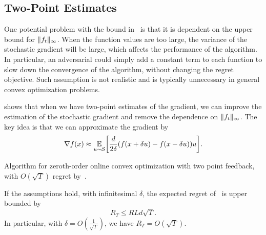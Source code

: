\documentclass[11pt]{article}
\begin{document}
\subsection{Two-Point Estimates}
One potential problem with the bound in~ is that it is dependent on the upper bound for $\lVert f_t\rVert_{\infty}$. When the function values are too large, the variance of the stochastic gradient will be large, which affects the performance of the algorithm. In particular, an adversarial could simply add a constant term to each function to slow down the convergence of the algorithm, without changing the regret objective. Such assumption is not realistic and is typically unnecessary in general convex optimization problems.

\cite{agarwal2010optimal} shows that when we have two-point estimates of the gradient, we can improve the estimation of the stochastic gradient and remove the dependence on $\lVert f_t\rVert_{\infty}$.
The key idea is that we can approximate the gradient by
\[
    \nabla f(x) \approx \E_{u \sim \Sc} \bracks*{\frac{d}{2\delta}(f(x + \delta u) - f(x - \delta u)) u}.
\]
\begin{algorithm}
    \begin{algorithmic}
        \EndFor
    \end{algorithmic}
    \caption{Algorithm for zeroth-order online convex optimization with two point feedback, with $O(\sqrt{T})$ regret by~\cite{agarwal2010optimal}.}
    \label{alg:2point}
\end{algorithm}
\begin{theorem}
    If the assumptions hold, with infinitesimal $\delta$, the expected regret of~ is upper bounded by
    \[
        R_T \le RLd\sqrt{T}.
    \]
    In particular, with $\delta = O(\frac{1}{\sqrt{T}})$, we have $R_T = O(\sqrt{T})$.
\end{theorem}
\end{document}
